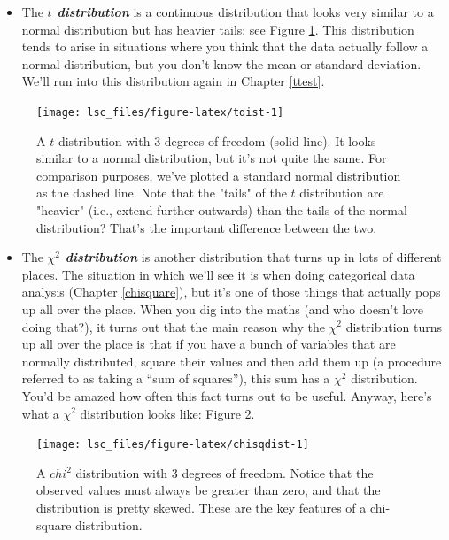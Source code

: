 \documentclass[
  11pt,
  a4paper,
  twoside,symmetric,openright]{book}
\providecommand{\tightlist}{%
  \setlength{\itemsep}{0pt}\setlength{\parskip}{0pt}}
\theoremstyle{break}
\theoremstyle{break}
\begin{document}
\begin{itemize}
\tightlist
\item
  The \textbf{\emph{\(t\) distribution}} is a continuous distribution that looks very similar to a normal distribution but has heavier tails: see Figure \ref{fig:tdist}. This distribution tends to arise in situations where you think that the data actually follow a normal distribution, but you don't know the mean or standard deviation. We'll run into this distribution again in Chapter \ref{ttest}.
\end{itemize}

\begin{figure}

{\centering \texttt{[image: lsc\_files/figure-latex/tdist-1]} 

}

\caption{A $t$ distribution with 3 degrees of freedom (solid line). It looks similar to a normal distribution, but it's not quite the same. For comparison purposes, we've plotted a standard normal distribution as the dashed line. Note that the "tails" of the $t$ distribution are "heavier" (i.e., extend further outwards) than the tails of the normal distribution? That's the important difference between the two. }\label{fig:tdist}
\end{figure}

\begin{itemize}
\tightlist
\item
  The \textbf{\emph{\(\chi^2\) distribution}} is another distribution that turns up in lots of different places. The situation in which we'll see it is when doing categorical data analysis (Chapter \ref{chisquare}), but it's one of those things that actually pops up all over the place. When you dig into the maths (and who doesn't love doing that?), it turns out that the main reason why the \(\chi^2\) distribution turns up all over the place is that if you have a bunch of variables that are normally distributed, square their values and then add them up (a procedure referred to as taking a ``sum of squares''), this sum has a \(\chi^2\) distribution. You'd be amazed how often this fact turns out to be useful. Anyway, here's what a \(\chi^2\) distribution looks like: Figure \ref{fig:chisqdist}.
\end{itemize}

\begin{figure}

{\centering \texttt{[image: lsc\_files/figure-latex/chisqdist-1]} 

}

\caption{A $chi^2$ distribution with 3 degrees of freedom. Notice that the observed values must always be greater than zero, and that the distribution is pretty skewed. These are the key features of a chi-square distribution.}\label{fig:chisqdist}
\end{figure}
\end{document}
